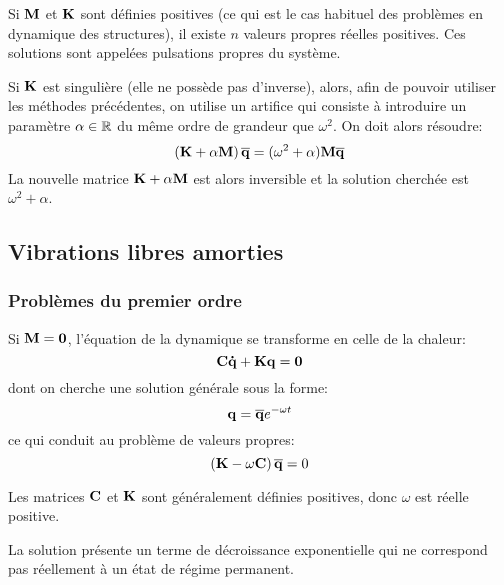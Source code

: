 \medskip
{}
Si $\mathbf{M}$ et $\mathbf{K}$ sont définies positives (ce qui est le cas habituel des problèmes en dynamique 
des structures), il existe $n$ valeurs propres réelles positives. Ces solutions sont appelées
pulsations propres du système.

Si $\mathbf{K}$ est singulière (elle ne possède pas d'inverse), alors, afin de pouvoir utiliser les méthodes
précédentes, on utilise un artifice qui consiste à introduire un paramètre $\alpha\in\mathbb R$ du 
même ordre de grandeur que $\omega^2$. On doit alors résoudre:
\begin{equation}\left(\mathbf{K}+\alpha \mathbf{M}\right)\mathbf{\overline{q}} = (\omega^2+\alpha)\mathbf{M} \mathbf{\overline{q}}\end{equation}
La nouvelle matrice $\mathbf{K}+\alpha \mathbf{M}$ est alors inversible et la solution cherchée est $\omega^2+\alpha$.



\medskip
\subsection{Vibrations libres amorties}

\medskip
\subsubsection{Problèmes du premier ordre}

Si $\mathbf{M}=\mathbf{0}$, l'équation de la dynamique se 
transforme en celle de la chaleur:
\begin{equation} \mathbf{C}\mathbf{\dot{q}}+\mathbf{K}\mathbf{q}=\mathbf{0} \end{equation}
dont on cherche une solution générale sous la forme:
\begin{equation} \mathbf{q}=\mathbf{\overline{q}}e^{-\omega t} \end{equation}
ce qui conduit au problème de valeurs propres:
\begin{equation} \left(\mathbf{K}-\omega\mathbf{C}\right)\mathbf{\overline{q}}=0\end{equation}

Les matrices $\mathbf{C}$ et $\mathbf{K}$ sont généralement définies positives, donc $\omega$ est réelle positive.

La solution présente un terme de décroissance exponentielle qui ne correspond pas réellement à un
état de régime permanent.


\medskip
